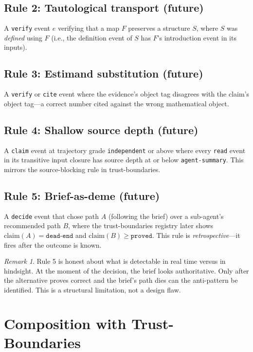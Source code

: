 \documentclass[11pt,a4paper]{article}
\theoremstyle{definition}
\theoremstyle{plain}
\theoremstyle{remark}
\newtheorem{remark}[definition]{Remark}
\begin{document}
\subsection{Rule 2: Tautological transport (future)}

A \texttt{verify} event $e$ verifying that a map $F$ preserves a structure $S$, where $S$ was \emph{defined} using $F$ (i.e., the definition event of $S$ has $F$'s introduction event in its inputs).

\subsection{Rule 3: Estimand substitution (future)}

A \texttt{verify} or \texttt{cite} event where the evidence's object tag disagrees with the claim's object tag---a correct number cited against the wrong mathematical object.

\subsection{Rule 4: Shallow source depth (future)}

A \texttt{claim} event at trajectory grade \texttt{independent} or above where every \texttt{read} event in its transitive input closure has source depth at or below \texttt{agent-summary}. This mirrors the source-blocking rule in trust-boundaries.

\subsection{Rule 5: Brief-as-deme (future)}

A \texttt{decide} event that chose path $A$ (following the brief) over a sub-agent's recommended path $B$, where the trust-boundaries registry later shows $\text{claim}(A) = \texttt{dead-end}$ and $\text{claim}(B) \geq \texttt{proved}$. This rule is \emph{retrospective}---it fires after the outcome is known.

\begin{remark}
Rule 5 is honest about what is detectable in real time versus in hindsight. At the moment of the decision, the brief looks authoritative. Only after the alternative proves correct and the brief's path dies can the anti-pattern be identified. This is a structural limitation, not a design flaw.
\end{remark}

\section{Composition with Trust-Boundaries}\label{sec:composition}
\end{document}
